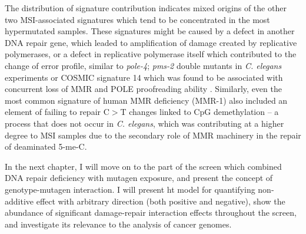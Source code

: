 The distribution of signature contribution indicates mixed origins of the other two MSI-associated signatures which tend to be concentrated in the most hypermutated samples. These signatures might be caused by a defect in another DNA repair gene, which leaded to amplification of damage created by replicative polymerases, or a defect in replicative polymerase itself which contributed to the change of error profile, similar to \textit{pole-4}; \textit{pms-2} double mutants in \textit{C. elegans} experiments or COSMIC signature 14 which was found to be associated with concurrent loss of MMR and POLE proofreading ability \cite{Haradhvala2018-ma}. Similarly, even the most common signature of human MMR deficiency (MMR-1) also included an element of failing to repair C$>$T changes linked to CpG demethylation -- a process that does not occur in \textit{C. elegans}, which was contributing at a higher degree to MSI samples due to the secondary role of MMR machinery in the repair of deaminated 5-me-C.

In the next chapter, I will move on to the part of the screen which combined DNA repair deficiency with mutagen exposure, and present the concept of genotype-mutagen interaction. I will present ht model for quantifying non-additive effect with arbitrary direction (both positive and negative), show the abundance of significant damage-repair interaction effects throughout the screen, and investigate its relevance to the analysis of cancer genomes.






